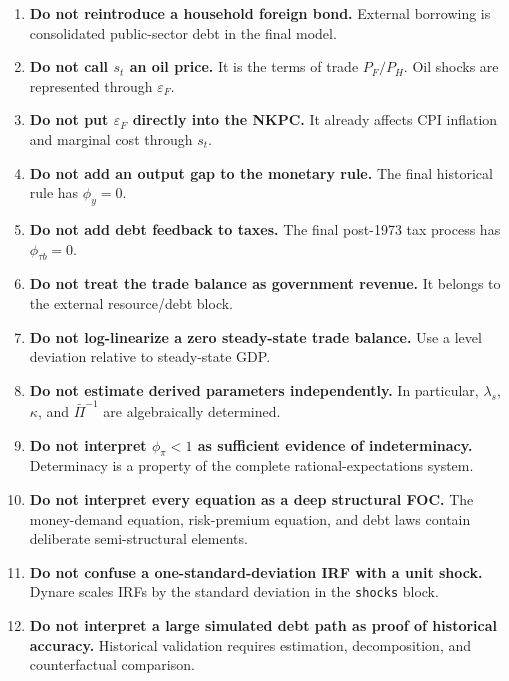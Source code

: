 \begin{enumerate}
    \item \textbf{Do not reintroduce a household foreign bond.}
    External borrowing is consolidated public-sector debt in the final model.

    \item \textbf{Do not call \(s_t\) an oil price.}
    It is the terms of trade \(P_F/P_H\). Oil shocks are represented through
    \(\varepsilon_F\).

    \item \textbf{Do not put \(\varepsilon_F\) directly into the NKPC.}
    It already affects CPI inflation and marginal cost through \(s_t\).

    \item \textbf{Do not add an output gap to the monetary rule.}
    The final historical rule has \(\phi_y=0\).

    \item \textbf{Do not add debt feedback to taxes.}
    The final post-1973 tax process has \(\phi_{\tau b}=0\).

    \item \textbf{Do not treat the trade balance as government revenue.}
    It belongs to the external resource/debt block.

    \item \textbf{Do not log-linearize a zero steady-state trade balance.}
    Use a level deviation relative to steady-state GDP.

    \item \textbf{Do not estimate derived parameters independently.}
    In particular, \(\lambda_s\), \(\kappa\), and \(\bar\Pi^{-1}\) are
    algebraically determined.

    \item \textbf{Do not interpret \(\phi_\pi<1\) as sufficient evidence of
    indeterminacy.}
    Determinacy is a property of the complete rational-expectations system.

    \item \textbf{Do not interpret every equation as a deep structural FOC.}
    The money-demand equation, risk-premium equation, and debt laws contain
    deliberate semi-structural elements.

    \item \textbf{Do not confuse a one-standard-deviation IRF with a unit shock.}
    Dynare scales IRFs by the standard deviation in the \texttt{shocks} block.

    \item \textbf{Do not interpret a large simulated debt path as proof of
    historical accuracy.}
    Historical validation requires estimation, decomposition, and
    counterfactual comparison.
\end{enumerate}

